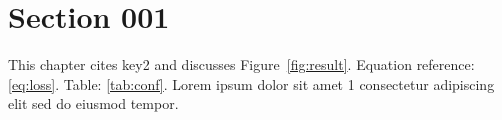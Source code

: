 \section{Section 001}\label{sec:s1}
This chapter cites key2 and discusses Figure~\ref{fig:result}.
Equation reference: \eqref{eq:loss}. Table: \ref{tab:conf}.
Lorem ipsum dolor sit amet 1 consectetur adipiscing elit sed do eiusmod tempor.
